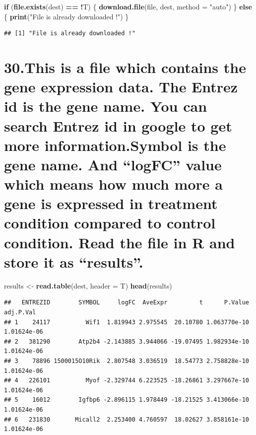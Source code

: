 \documentclass[]{article}
\newenvironment{Shaded}{\begin{snugshade}}{\end{snugshade}}
\newcommand{\ControlFlowTok}[1]{\textcolor[rgb]{0.13,0.29,0.53}{\textbf{#1}}}
\newcommand{\DataTypeTok}[1]{\textcolor[rgb]{0.13,0.29,0.53}{#1}}
\newcommand{\KeywordTok}[1]{\textcolor[rgb]{0.13,0.29,0.53}{\textbf{#1}}}
\newcommand{\NormalTok}[1]{#1}
\newcommand{\OperatorTok}[1]{\textcolor[rgb]{0.81,0.36,0.00}{\textbf{#1}}}
\newcommand{\StringTok}[1]{\textcolor[rgb]{0.31,0.60,0.02}{#1}}
\begin{document}
\begin{Shaded}
\begin{Highlighting}[]
\ControlFlowTok{if}\NormalTok{ (}\KeywordTok{file.exists}\NormalTok{(dest) }\OperatorTok{==}\StringTok{ }\OperatorTok{!}\NormalTok{T) \{}
  \KeywordTok{download.file}\NormalTok{(file, dest, }\DataTypeTok{method =} \StringTok{"auto"}\NormalTok{)}
\NormalTok{\} }\ControlFlowTok{else}\NormalTok{ \{}
  \KeywordTok{print}\NormalTok{(}\StringTok{"File is already downloaded !"}\NormalTok{)}
\NormalTok{\}}
\end{Highlighting}
\end{Shaded}

\begin{verbatim}
## [1] "File is already downloaded !"
\end{verbatim}

\hypertarget{this-is-a-file-which-contains-the-gene-expression-data.-the-entrez-id-is-the-gene-name.-you-can-search-entrez-id-in-google-to-get-more-information.symbol-is-the-gene-name.-and-logfc-value-which-means-how-much-more-a-gene-is-expressed-in-treatment-condition-compared-to-control-condition.-read-the-file-in-r-and-store-it-as-results.}{%
\section{30.This is a file which contains the gene expression data. The
Entrez id is the gene name. You can search Entrez id in google to get
more information.Symbol is the gene name. And ``logFC'' value which
means how much more a gene is expressed in treatment condition compared
to control condition. Read the file in R and store it as
``results''.}\label{this-is-a-file-which-contains-the-gene-expression-data.-the-entrez-id-is-the-gene-name.-you-can-search-entrez-id-in-google-to-get-more-information.symbol-is-the-gene-name.-and-logfc-value-which-means-how-much-more-a-gene-is-expressed-in-treatment-condition-compared-to-control-condition.-read-the-file-in-r-and-store-it-as-results.}}

\begin{Shaded}
\begin{Highlighting}[]
\NormalTok{results <-}\StringTok{ }\KeywordTok{read.table}\NormalTok{(dest, }\DataTypeTok{header =}\NormalTok{ T)}
\KeywordTok{head}\NormalTok{(results)}
\end{Highlighting}
\end{Shaded}

\begin{verbatim}
##   ENTREZID        SYMBOL     logFC  AveExpr         t      P.Value   adj.P.Val
## 1    24117          Wif1  1.819943 2.975545  20.10780 1.063770e-10 1.01624e-06
## 2   381290        Atp2b4 -2.143885 3.944066 -19.07495 1.982934e-10 1.01624e-06
## 3    78896 1500015O10Rik  2.807548 3.036519  18.54773 2.758828e-10 1.01624e-06
## 4   226101          Myof -2.329744 6.223525 -18.26861 3.297667e-10 1.01624e-06
## 5    16012        Igfbp6 -2.896115 1.978449 -18.21525 3.413066e-10 1.01624e-06
## 6   231830       Micall2  2.253400 4.760597  18.02627 3.858161e-10 1.01624e-06
\end{verbatim}
\end{document}
